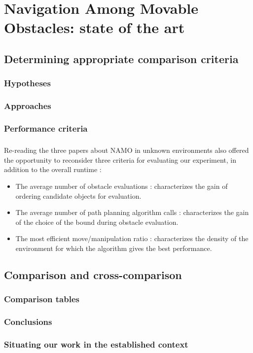 
\chapter{Navigation Among Movable Obstacles: state of the art} %

\label{Chapter2} %

\section{Determining appropriate comparison criteria}

\subsection{Hypotheses}

\subsection{Approaches}

\subsection{Performance criteria}

\paragraph{} Re-reading the three papers about NAMO in unknown environments also offered the opportunity to reconsider three criteria for evaluating our experiment, in addition to the overall runtime :

\begin{itemize}
  \item The average number of obstacle evaluations : characterizes the gain of ordering candidate objects for evaluation.
  \item The average number of path planning algorithm calls : characterizes the gain of the choice of the bound during obstacle evaluation.
  \item The most efficient move/manipulation ratio : characterizes the density of the environment for which the algorithm gives the best performance.
\end{itemize}

\section{Comparison and cross-comparison}

\subsection{Comparison tables}


\subsection{Conclusions}

\subsection{Situating our work in the established context}
